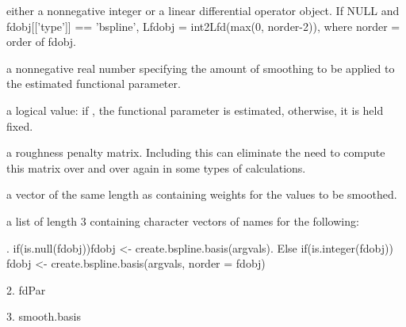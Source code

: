 \begin{Arguments}
\begin{ldescription}
{}

\item[\code{Lfdobj}] either a nonnegative integer or a linear differential operator
object.  If NULL and fdobj[['type']] == 'bspline', Lfdobj =
int2Lfd(max(0, norder-2)), where norder = order of fdobj.   

\item[\code{lambda}] a nonnegative real number specifying the amount of smoothing
to be applied to the estimated functional parameter.

\item[\code{estimate}] a logical value:  if , the functional parameter is
estimated, otherwise, it is held fixed.

\item[\code{penmat}] a roughness penalty matrix.  Including this can eliminate the need
to compute this matrix over and over again in some types of
calculations.

\item[\code{wtvec}] a vector of the same length as  containing weights for
the values to be smoothed. 

\item[\code{fdnames}] a list of length 3 containing character vectors of names for the
following: 


\end{ldescription}
\end{Arguments}
\begin{Details}.  if(is.null(fdobj))fdobj <- create.bspline.basis(argvals).  Else
if(is.integer(fdobj)) fdobj <- create.bspline.basis(argvals, norder =
fdobj) 

2.  fdPar

3.  smooth.basis
\end{Details}
